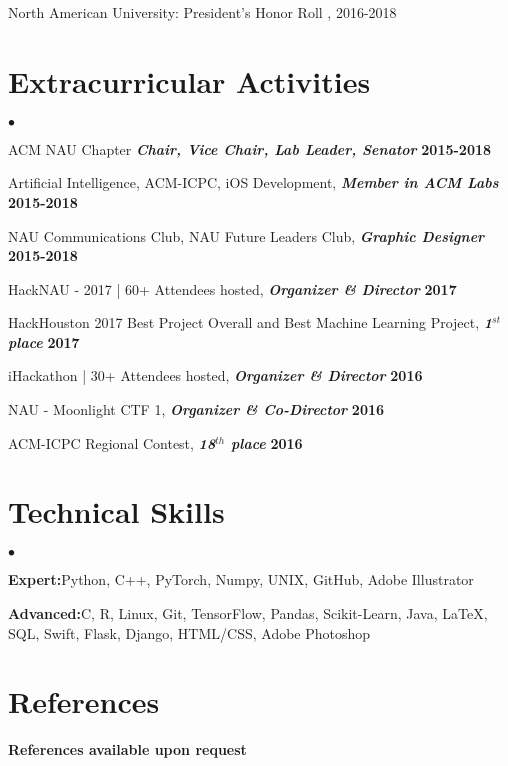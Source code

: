 \documentclass[margin,line]{res}
\newenvironment{list2}{
  \begin{list}{$\bullet$}{%
      \setlength{\itemsep}{0in}
      \setlength{\parsep}{0in} \setlength{\parskip}{0in}
      \setlength{\topsep}{0in} \setlength{\partopsep}{0in} 
      \setlength{\leftmargin}{0.2in}}}{\end{list}}
\begin{document}
\begin{resume}
\vspace*{-2.5mm}
North American University: President's Honor Roll , 2016-2018


\section{\sc Extracurricular Activities}
\begin{list2}
\item ACM NAU Chapter {\em \textbf{Chair, Vice Chair, Lab Leader, Senator}} \hfill {\bf 2015-2018}
\item Artificial Intelligence, ACM-ICPC, iOS Development, {\em \textbf{Member in ACM Labs}} \hfill {\bf 2015-2018}
\item NAU Communications Club, NAU Future Leaders Club, {\em \textbf{Graphic Designer}} \hfill  {\bf 2015-2018}
\item HackNAU - 2017 | 60+ Attendees hosted, {\em \textbf{Organizer \& Director}} \hfill {\bf 2017}
\item HackHouston 2017 Best Project Overall and Best Machine Learning Project, {\em \textbf{1$^{st}$ place}} \hfill  {\bf 2017}
\item iHackathon | 30+ Attendees hosted, {\em \textbf{Organizer \& Director}} \hfill {\bf 2016} 
\item NAU - Moonlight CTF 1, {\em \textbf{Organizer \& Co-Director}} \hfill {\bf 2016}
\item ACM-ICPC Regional Contest, {\em \textbf{18$^{th}$ place}} \hfill  {\bf 2016}
\end{list2}

\section{\sc Technical Skills} 
\begin{list2}
\item{\textbf{Expert:}\space Python, C++, PyTorch, Numpy, UNIX, GitHub, Adobe Illustrator}
\item{\textbf{Advanced:}\space C, R, Linux, Git, TensorFlow, Pandas, Scikit-Learn, Java, \LaTeX, SQL, Swift, Flask, Django, HTML/CSS, Adobe Photoshop}
\end{list2}

\section{\sc References} 
{\bf References available upon request}


\end{resume}
\end{document}
